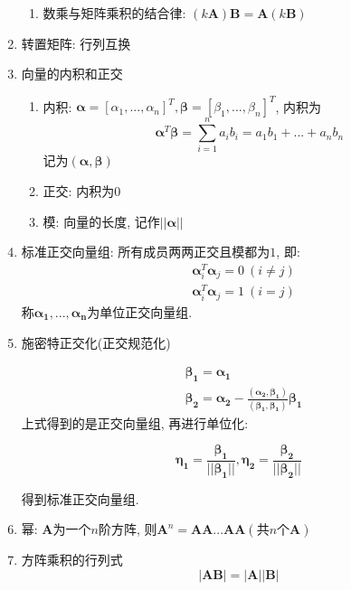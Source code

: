 \begin{enumerate}
\begin{enumerate}
\item 数乘与矩阵乘积的结合律: $ (k\bm{A})\bm{B}=\bm{A}(k\bm{B}) $
\end{enumerate}
\item 转置矩阵: 行列互换
\item 向量的内积和正交
\begin{enumerate}
\item 内积: $ \bm{\alpha} = [\alpha_{1},...,\alpha_{n}]^{T}, \bm{\beta} = [\beta_{1},...,\beta_{n}]^{T} $, 内积为
\begin{equation*}
\bm{\alpha}^{T}\bm{\beta}=\sum_{i=1}^{n}a_{i}b_{i}=a_{1}b_{1}+...+a_{n}b_{n}
\end{equation*}
记为$ (\bm{\alpha},\bm{\beta}) $
\item 正交: 内积为$ 0 $
\item 模: 向量的长度, 记作$ ||\bm{\alpha}|| $
\end{enumerate}
\item 标准正交向量组: 所有成员两两正交且模都为$ 1 $, 即:
\begin{equation*}
\begin{aligned}
&\bm{\alpha}_{i}^{T}\bm{\alpha}_{j}=0\ (i\neq j)\\&\bm{\alpha}_{i}^{T}\bm{\alpha}_{j}=1\ (i=j)
\end{aligned}
\end{equation*}
称$ \bm{\alpha_{1}},...,\bm{\alpha_{n}} $为单位正交向量组.
\item 施密特正交化(正交规范化)\par
\begin{equation*}
\begin{aligned}
&\bm{\beta_{1}}=\bm{\alpha_{1}}\\&\bm{\beta_{2}}=\bm{\alpha_{2}}-\frac{(\bm{\alpha_{2}},\bm{\beta_{1}})}{(\bm{\beta_{1}},\bm{\beta_{1}})}\bm{\beta_{1}}
\end{aligned}
\end{equation*}
上式得到的是正交向量组, 再进行单位化:\par
\begin{equation*}
\bm{\eta_{1}}=\frac{\bm{\beta_{1}}}{||\bm{\beta_{1}}||}, \bm{\eta_{2}}=\frac{\bm{\beta_{2}}}{||\bm{\beta_{2}}||}
\end{equation*}\par
得到标准正交向量组.
\item 幂: $ \bm{A} $为一个$ n $阶方阵, 则$ \bm{A}^{n}=\bm{A}\bm{A}...\bm{A}\bm{A}(\text{共}n\text{个}\bm{A}) $
\item 方阵乘积的行列式
\begin{equation*}
|\bm{A}\bm{B}|=|\bm{A}||\bm{B}|
\end{equation*}
\end{enumerate}
